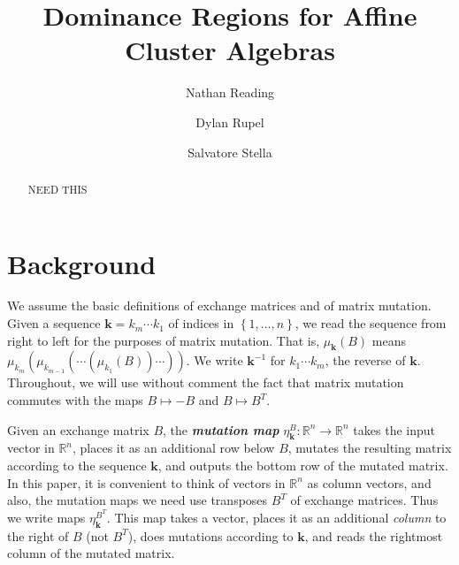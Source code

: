 \documentclass{amsart}
\author{Nathan Reading}
\author{Dylan Rupel}
\author{Salvatore Stella}
\title{Dominance Regions for Affine Cluster Algebras}
\theoremstyle{definition}
\theoremstyle{remark}
\numberwithin{equation}{section}
\newcommand{\newword}[1]{\textbf{\emph{#1}}}
\newcommand{\reals}{\mathbb R}
\newcommand{\set}[1]{{\left\lbrace #1 \right\rbrace}}
\newcommand{\0}{{\mathbf{0}}}
\newcommand{\kk}{\mathbf{k}}
\begin{document}
\begin{abstract}
NEED THIS
\end{abstract}

\maketitle

\vspace{-8pt}

\setcounter{tocdepth}{2}
\tableofcontents





\section{Background}
We assume the basic definitions of exchange matrices and of matrix mutation.
Given a sequence $\kk=k_m\cdots k_1$ of indices in $\set{1,\ldots,n}$, we read the sequence from right to left for the purposes of matrix mutation.
That is, $\mu_\kk(B)$ means $\mu_{k_m}(\mu_{k_{m-1}}(\cdots(\mu_{k_1}(B))\cdots))$.
We write $\kk^{-1}$ for $k_1\cdots k_m$, the reverse of $\kk$.
Throughout, we will use without comment the fact that matrix mutation commutes with the maps $B\mapsto-B$ and $B\mapsto B^T$.

Given an exchange matrix $B$, the \newword{mutation map} $\eta^B_\kk:\reals^n\to\reals^n$ takes the input vector in $\reals^n$, places it as an additional row below $B$, mutates the resulting matrix according to the sequence $\kk$, and outputs the bottom row of the mutated matrix.
In this paper, it is convenient to think of vectors in $\reals^n$ as column vectors, and also, the mutation maps we need use transposes $B^T$ of exchange matrices.
Thus we write maps $\eta_\kk^{B^T}$.
This map takes a vector, places it as an additional \emph{column} to the right of $B$ (not $B^T$), does mutations according to $\kk$, and reads the rightmost column of the mutated matrix.
\end{document}
